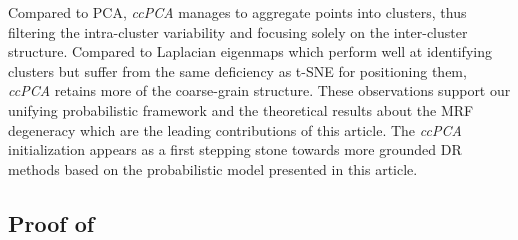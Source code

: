 Compared to PCA, \textit{ccPCA} manages to aggregate points into clusters, thus filtering the intra-cluster variability and focusing solely on the inter-cluster structure. Compared to Laplacian eigenmaps which perform well at identifying clusters but suffer from the same deficiency as t-SNE for positioning them, \textit{ccPCA} retains more of the coarse-grain structure. These observations support our unifying probabilistic framework and the theoretical results about the MRF degeneracy which are the leading contributions of this article. The \textit{ccPCA} initialization appears as a first stepping stone towards more grounded DR methods based on the probabilistic model presented in this article.

\subsection{Proof of }

\PCAgraphcoupling*

